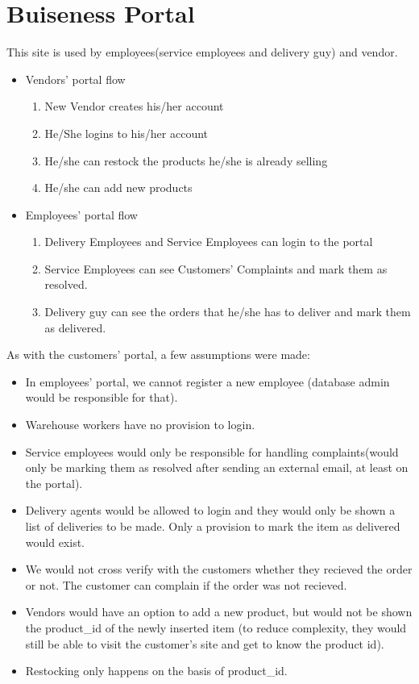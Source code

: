 \documentclass[12pt]{report}
\begin{document}
   
    \section{Buiseness Portal}
    This site is used by employees(service employees and delivery guy) and vendor.
        \begin{itemize}
            \item Vendors' portal flow
                \begin{enumerate}
                    \item New Vendor creates his/her account 
                    \item He/She logins to his/her account
                    \item He/she can restock the products he/she is already selling
                    \item He/she can add new products
            \end{enumerate}
            \item Employees' portal flow
                \begin{enumerate}
                    \item Delivery Employees and Service Employees can login to the portal
                    \item Service Employees can see Customers' Complaints and mark them as resolved.
                    \item Delivery guy can see the orders that he/she has to deliver and mark them as delivered.    
            \end{enumerate}
        \end{itemize}
    As with the customers' portal, a few assumptions were made:
    \\
    \begin{itemize}
        \item In employees' portal, we cannot register a new employee (database admin would be responsible for that).
        \item Warehouse workers have no provision to login.
        \item Service employees would only be responsible for handling complaints(would only be marking them as resolved after sending an external email, at least on the portal).
        \item Delivery agents would be allowed to login and they would only be shown a list of deliveries to be made. Only a provision to mark the item as delivered would exist.
        \item We would not cross verify with the customers whether they recieved the order or not. The customer can complain if the order was not recieved.  
        \item Vendors would have an option to add a new product, but would not be shown the product\_id of the newly inserted item (to reduce complexity, they would still be able to visit the customer's site and get to know the product id).
        \item Restocking only happens on the basis of product\_id.
    \end{itemize}
\end{document}
